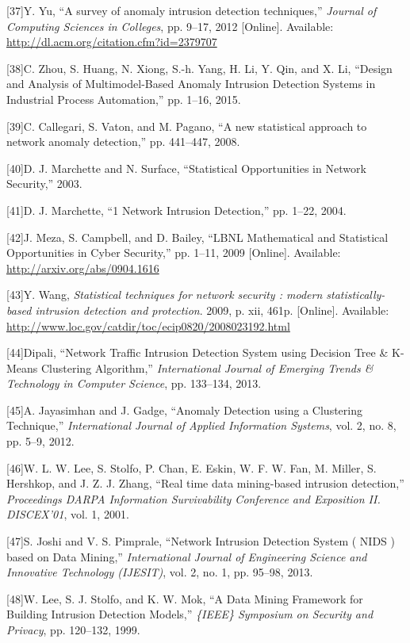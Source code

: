 \documentclass[12pt,]{article}
\begin{document}
{[}37{]}Y. Yu, ``A survey of anomaly intrusion detection techniques,''
\emph{Journal of Computing Sciences in Colleges}, pp. 9--17, 2012
{[}Online{]}. Available: \url{http://dl.acm.org/citation.cfm?id=2379707}

{[}38{]}C. Zhou, S. Huang, N. Xiong, S.-h. Yang, H. Li, Y. Qin, and X.
Li, ``Design and Analysis of Multimodel-Based Anomaly Intrusion
Detection Systems in Industrial Process Automation,'' pp. 1--16, 2015.

{[}39{]}C. Callegari, S. Vaton, and M. Pagano, ``A new statistical
approach to network anomaly detection,'' pp. 441--447, 2008.

{[}40{]}D. J. Marchette and N. Surface, ``Statistical Opportunities in
Network Security,'' 2003.

{[}41{]}D. J. Marchette, ``1 Network Intrusion Detection,'' pp. 1--22,
2004.

{[}42{]}J. Meza, S. Campbell, and D. Bailey, ``LBNL Mathematical and
Statistical Opportunities in Cyber Security,'' pp. 1--11, 2009
{[}Online{]}. Available: \url{http://arxiv.org/abs/0904.1616}

{[}43{]}Y. Wang, \emph{Statistical techniques for network security :
modern statistically-based intrusion detection and protection}. 2009, p.
xii, 461p. {[}Online{]}. Available:
\url{http://www.loc.gov/catdir/toc/ecip0820/2008023192.html}

{[}44{]}Dipali, ``Network Traffic Intrusion Detection System using
Decision Tree \& K-Means Clustering Algorithm,'' \emph{International
Journal of Emerging Trends \& Technology in Computer Science}, pp.
133--134, 2013.

{[}45{]}A. Jayasimhan and J. Gadge, ``Anomaly Detection using a
Clustering Technique,'' \emph{International Journal of Applied
Information Systems}, vol. 2, no. 8, pp. 5--9, 2012.

{[}46{]}W. L. W. Lee, S. Stolfo, P. Chan, E. Eskin, W. F. W. Fan, M.
Miller, S. Hershkop, and J. Z. J. Zhang, ``Real time data mining-based
intrusion detection,'' \emph{Proceedings DARPA Information Survivability
Conference and Exposition II. DISCEX'01}, vol. 1, 2001.

{[}47{]}S. Joshi and V. S. Pimprale, ``Network Intrusion Detection
System ( NIDS ) based on Data Mining,'' \emph{International Journal of
Engineering Science and Innovative Technology (IJESIT)}, vol. 2, no. 1,
pp. 95--98, 2013.

{[}48{]}W. Lee, S. J. Stolfo, and K. W. Mok, ``A Data Mining Framework
for Building Intrusion Detection Models,'' \emph{\{IEEE\} Symposium on
Security and Privacy}, pp. 120--132, 1999.
\end{document}
